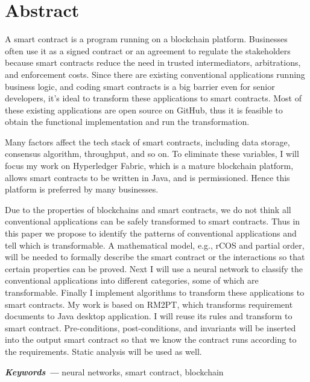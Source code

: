 \chapter{Abstract}

A smart contract is a program running on a blockchain platform.
Businesses often use it as a signed contract or an agreement to regulate the stakeholders
because smart contracts reduce the need in trusted intermediators, arbitrations, and enforcement costs.
Since there are existing conventional applications running business logic, 
and coding smart contracts is a big barrier even for senior developers,
it’s ideal to transform these applications to smart contracts. 
Most of these existing applications are open source on GitHub, thus it is feasible to obtain the functional implementation and run the transformation.

Many factors affect the tech stack of smart contracts, including data storage, consensus algorithm, throughput, and so on.
To eliminate these variables, I will focus my work on Hyperledger Fabric, 
which is a mature blockchain platform, allows smart contracts to be written in Java, and is permissioned. 
Hence this platform is preferred by many businesses.

Due to the properties of blockchains and smart contracts, we do not think all conventional applications can be safely transformed to smart contracts.
Thus in this paper we propose to identify the patterns of conventional applications and tell which is transformable.
A mathematical model, e.g., rCOS and partial order, will be needed to formally describe the smart contract or the interactions so that certain properties can be proved.
Next I will use a neural network to classify the conventional applications into different categories, some of which are transformable.
Finally I implement algorithms to transform these applications to smart contracts.
My work is based on RM2PT, which transforms requirement documents to Java desktop application. I will reuse its rules and transform to smart contract.
Pre-conditions, post-conditions, and invariants will be inserted into the output smart contract so that we know the contract runs according to the requirements.
Static analysis will be used as well.



\textbf{\textit{Keywords ---}} neural networks, smart contract, blockchain